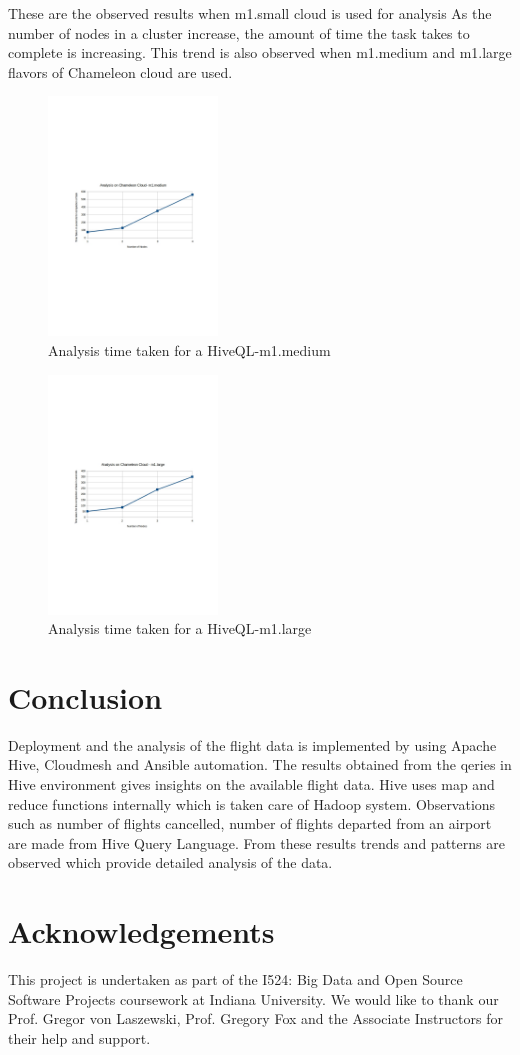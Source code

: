 \documentclass[9pt,twocolumn,twoside]{../../styles/osajnl}
\begin{document}
These are the observed results when m1.small cloud is used for
analysis As the number of nodes in a cluster increase, the amount of
time the task takes to complete is increasing. This trend is also
observed when m1.medium and m1.large flavors of Chameleon cloud are
used.

\begin{figure}[htbp]
  \includegraphics[width= \linewidth, height =
    2.5in]{images/m1medium.pdf}
  \caption{Analysis time taken for a HiveQL-m1.medium }
\end{figure}

\begin{figure}[htbp]
  \includegraphics[width= \linewidth, height =
    2.5in]{images/m1large.pdf}
  \caption{Analysis time taken for a HiveQL-m1.large }
\end{figure}

\section{Conclusion}
Deployment and the analysis of the flight data is implemented by using
Apache Hive, Cloudmesh and Ansible automation. The results obtained
from the qeries in Hive environment gives insights on the available
flight data. Hive uses map and reduce functions internally which is
taken care of Hadoop system. Observations such as number of flights
cancelled, number of flights departed from an airport are made from
Hive Query Language. From these results trends and patterns are
observed which provide detailed analysis of the data.
\section{Acknowledgements}

This project is undertaken as part of the I524: Big Data and Open
Source Software Projects coursework at Indiana University. We would
like to thank our Prof. Gregor von Laszewski, Prof. Gregory Fox and
the Associate Instructors for their help and support.


\end{document}
